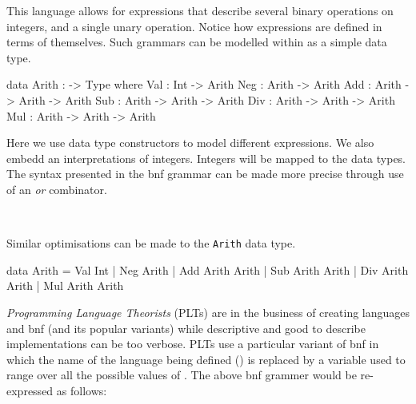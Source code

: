 \noindent
This language allows for expressions that describe several binary operations on integers, and a single unary operation.
Notice how expressions are defined in terms of themselves.
Such grammars can be modelled within \idris{} as a simple data type.

\begin{code}
data Arith : -> Type where
  Val : Int            -> Arith
  Neg : Arith          -> Arith
  Add : Arith -> Arith -> Arith
  Sub : Arith -> Arith -> Arith
  Div : Arith -> Arith -> Arith
  Mul : Arith -> Arith -> Arith
\end{code}

\noindent
Here we use data type constructors to model different expressions.
We also embedd an interpretations of integers.
Integers will be mapped to the \idris{} data types.
The syntax presented in the \ac{bnf} grammar can be made more precise through use of an \emph{or} combinator.

\begin{bnf}
\\
\end{bnf}

\noindent
Similar optimisations can be made to the \texttt{Arith} data type.

\begin{code}
data Arith = Val Int
           | Neg Arith
           | Add Arith Arith
           | Sub Arith Arith
           | Div Arith Arith
           | Mul Arith Arith
\end{code}

\noindent
\emph{Programming Language Theorists} (PLTs) are in the business of creating languages and \ac{bnf} (and its popular variants) while descriptive and good to describe implementations can be too verbose.
PLTs use a particular variant of \ac{bnf} in which the name of the language being defined (\allang{}) is replaced by a variable used to range over all the possible values of \allang{}.
The above \ac{bnf} grammer would be re-expressed as follows:

\begin{bnf}
\end{bnf}

